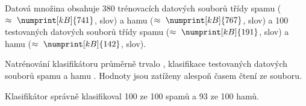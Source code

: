 \documentclass[a4paper, 12pt]{report}
\begin{document}
Datová množina obsahuje 380 trénovacích datových souborů třídy spamu ($\approx~\numprint[kB]{741}$,  slov) a hamu ($\approx~\numprint[kB]{767}$,  slov) a 
100 testovaných datových souborů třídy spamu ($\approx~\numprint[kB]{191}$,  slov) a hamu ($\approx~\numprint[kB]{142}$,  slov).

Natrénování klasifikátoru průměrně trvalo , 
klasifikace testovaných datových souborů spamu  a hamu 
. Hodnoty jsou zatíženy alespoň časem čtení ze souboru.

Klasifikátor správně klasifikoval 100 ze 100 spamů a 93 ze 100 hamů.
\end{document}
